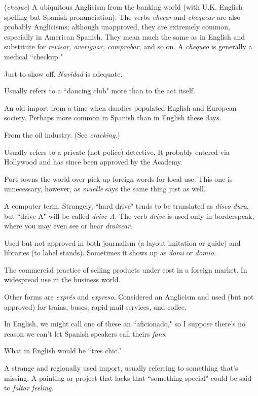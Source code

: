  (\emph{cheque}) A ubiquitous Anglicism from the banking world (with U.K. English spelling but Spanish pronunciation). The
verbs \emph{checar} and \emph{chequear} are also probably Anglicisms; although unapproved, they are extremely common, especially in American Spanish. They mean much the same as in English and substitute for \emph{revisar,
averiguar, comprobar}, and so on. A \emph{chequeo} is generally a medical
``checkup."

 Just to show off. \emph{Navidad} is adequate.

 Usually refers to a ``dancing club" more than to
the act itself.

 An old import from a time when dandies populated
English and European society. Perhaps more common in Spanish than
in English these days.

 From the oil industry. (See \emph{cracking}.)

 Usually refers to a private (not police) detective,
It probably entered via Hollywood and has since been approved by the
Academy.

 Port towns the world over pick up foreign words for local use. This one is unnecessary, however, as \emph{muelle} says the same
thing just as well.

 A computer term. Strangely, ``hard drive" tends to be
translated as \emph{disco dura}, but ``drive A" will be called \emph{drive A}. The
verb \emph{drive} is used only in borderspeak, where you may even see or hear
\emph{draivear}.

 Used but not approved in both journalism (a layout
imitation or guide) and libraries (to label stands). Sometimes it shows
up as \emph{domi} or \emph{domio}.

 The commercial practice of selling products under
cost in a foreign market. In widespread use in the business world.

 Other forms are \emph{exprés} and \emph{expreso}. Considered an
Anglicism and used (but not approved) for trains, buses, rapid-mail services, and coffee.

 In English, we might call one of these an ``aficionado,"
so I suppose there's no reason we can't let Spanish speakers call
theirs \emph{fans}.

 What in English would be ``tres chic."

 A strange and regionally used import, usually referring to something that's missing. A painting or project that lacks that
``something special" could be said to \emph{faltar feeling}.

